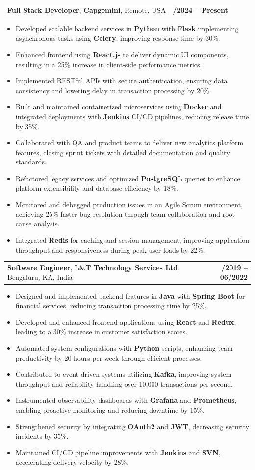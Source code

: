 \documentclass[letterpaper,11pt]{article}
\makeatletter
\newcommand{\resumeItem}[1]{
  \item\footnotesize{
    {#1 \vspace{-2pt}}
  }
}
\newcommand{\resumeSubheading}[4]{
  \vspace{-2pt}\item
    \begin{tabular*}{1.0\textwidth}[t]{l@{\extracolsep{\fill}}r}
      \textbf{\fontsize{10pt}{14pt}\selectfont #3}, \textbf{\fontsize{10pt}{14pt}\selectfont #1}, \fontsize{10pt}{14pt}\selectfont #4 & \textbf{\fontsize{10pt}{14pt}\selectfont #2} \\
    \end{tabular*}\vspace{-7pt}
}
\newcommand{\resumeItemListStart}{\begin{itemize}[leftmargin=*]}
\newcommand{\resumeItemListEnd}{\end{itemize}\vspace{-5pt}}
\makeatother
\begin{document}
    \resumeSubheading
        {Capgemini}{01/2024 -- Present}
        {Full Stack Developer}{Remote, USA}
      \resumeItemListStart
        \resumeItem{Developed scalable backend services in \textbf{Python} with \textbf{Flask} implementing asynchronous tasks using \textbf{Celery}, improving response time by 30\%.}
        \resumeItem{Enhanced frontend using \textbf{React.js} to deliver dynamic UI components, resulting in a 25\% increase in client-side performance metrics.}
        \resumeItem{Implemented RESTful APIs with secure authentication, ensuring data consistency and lowering delay in transaction processing by 20\%.}
        \resumeItem{Built and maintained containerized microservices using \textbf{Docker} and integrated deployments with \textbf{Jenkins} CI/CD pipelines, reducing release time by 35\%.}
        \resumeItem{Collaborated with QA and product teams to deliver new analytics platform features, closing sprint tickets with detailed documentation and quality standards.}
        \resumeItem{Refactored legacy services and optimized \textbf{PostgreSQL} queries to enhance platform extensibility and database efficiency by 18\%.}
        \resumeItem{Monitored and debugged production issues in an Agile Scrum environment, achieving 25\% faster bug resolution through team collaboration and root cause analysis.}
        \resumeItem{Integrated \textbf{Redis} for caching and session management, improving application throughput and responsiveness during peak user loads by 22\%.}
      \resumeItemListEnd

    \resumeSubheading
        {L\&T Technology Services Ltd}{08/2019 -- 06/2022}
        {Software Engineer}{Bengaluru, KA, India}
      \resumeItemListStart
        \resumeItem{Designed and implemented backend features in \textbf{Java} with \textbf{Spring Boot} for financial services, reducing transaction processing time by 25\%.}
        \resumeItem{Developed and enhanced frontend applications using \textbf{React} and \textbf{Redux}, leading to a 30\% increase in customer satisfaction scores.}
        \resumeItem{Automated system configurations with \textbf{Python} scripts, enhancing team productivity by 20 hours per week through efficient processes.}
        \resumeItem{Contributed to event-driven systems utilizing \textbf{Kafka}, improving system throughput and reliability handling over 10,000 transactions per second.}
        \resumeItem{Instrumented observability dashboards with \textbf{Grafana} and \textbf{Prometheus}, enabling proactive monitoring and reducing downtime by 15\%.}
        \resumeItem{Strengthened security by integrating \textbf{OAuth2} and \textbf{JWT}, decreasing security incidents by 35\%.}
        \resumeItem{Maintained CI/CD pipeline improvements with \textbf{Jenkins} and \textbf{SVN}, accelerating delivery velocity by 28\%.}
      \resumeItemListEnd
\end{document}
